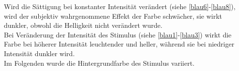 \documentclass[11pt]{article}
\begin{document}
Wird die Sättigung bei konstanter Intensität verändert (siehe \ref{blau6}-\ref{blau8}), wird der subjektiv wahrgenommene Effekt der Farbe schwächer, sie wirkt dunkler, obwohl die Helligkeit nicht verändert wurde. \\

Bei Veränderung der Intensität des Stimulus (siehe \ref{blau1}-\ref{blau3}) wirkt die Farbe bei höherer Intensität leuchtender und heller, während sie bei niedriger Intensität dunkler wird. \\

Im Folgenden wurde die Hintergrundfarbe des Stimulus variiert.

\end{document}
